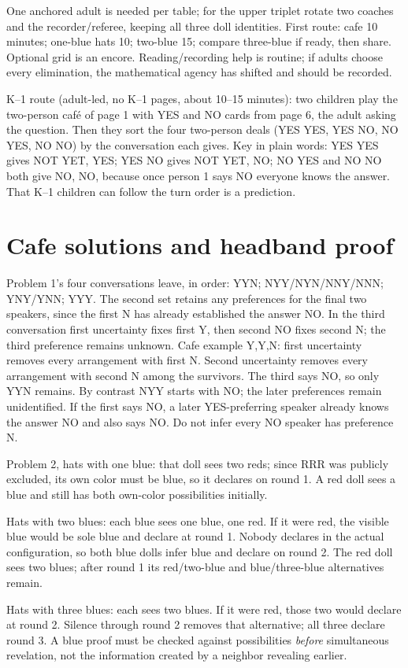 \documentclass[11pt,letterpaper]{article}
\begin{document}
One anchored adult is needed per table; for the upper triplet rotate two coaches and the recorder/referee, keeping all three doll identities. First route: cafe 10 minutes; one-blue hats 10; two-blue 15; compare three-blue if ready, then share. Optional grid is an encore. Reading/recording help is routine; if adults choose every elimination, the mathematical agency has shifted and should be recorded.

K--1 route (adult-led, no K--1 pages, about 10--15 minutes): two children play the two-person café of page 1 with YES and NO cards from page 6, the adult asking the question. Then they sort the four two-person deals (YES YES, YES NO, NO YES, NO NO) by the conversation each gives. Key in plain words: YES YES gives NOT YET, YES; YES NO gives NOT YET, NO; NO YES and NO NO both give NO, NO, because once person 1 says NO everyone knows the answer. That K--1 children can follow the turn order is a prediction.
\newpage
\section*{Cafe solutions and headband proof}
Problem 1's four conversations leave, in order: YYN; NYY/NYN/NNY/NNN; YNY/YNN; YYY. The second set retains any preferences for the final two speakers, since the first N has already established the answer NO. In the third conversation first uncertainty fixes first Y, then second NO fixes second N; the third preference remains unknown. Cafe example Y,Y,N: first uncertainty removes every arrangement with first N. Second uncertainty removes every arrangement with second N among the survivors. The third says NO, so only YYN remains. By contrast NYY starts with NO; the later preferences remain unidentified. If the first says NO, a later YES-preferring speaker already knows the answer NO and also says NO. Do not infer every NO speaker has preference N.

Problem 2, hats with one blue: that doll sees two reds; since RRR was publicly excluded, its own color must be blue, so it declares on round 1. A red doll sees a blue and still has both own-color possibilities initially.

Hats with two blues: each blue sees one blue, one red. If it were red, the visible blue would be sole blue and declare at round 1. Nobody declares in the actual configuration, so both blue dolls infer blue and declare on round 2. The red doll sees two blues; after round 1 its red/two-blue and blue/three-blue alternatives remain.

Hats with three blues: each sees two blues. If it were red, those two would declare at round 2. Silence through round 2 removes that alternative; all three declare round 3. A blue proof must be checked against possibilities \emph{before} simultaneous revelation, not the information created by a neighbor revealing earlier.
\end{document}
